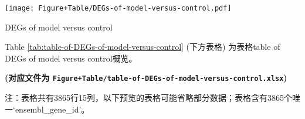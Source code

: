 \documentclass[
]{article}
\begin{document}
\def\@captype{figure}
\begin{center}
\texttt{[image: Figure+Table/DEGs-of-model-versus-control.pdf]}
\caption{DEGs of model versus control}\label{fig:DEGs-of-model-versus-control}
\end{center}

Table \ref{tab:table-of-DEGs-of-model-versus-control} (下方表格) 为表格table of DEGs of model versus control概览。

\textbf{(对应文件为 \texttt{Figure+Table/table-of-DEGs-of-model-versus-control.xlsx})}

\begin{center}\begin{tcolorbox}[colback=gray!10, colframe=gray!50, width=0.9\linewidth, arc=1mm, boxrule=0.5pt]注：表格共有3865行15列，以下预览的表格可能省略部分数据；表格含有3865个唯一`ensembl\_gene\_id'。
\end{tcolorbox}
\end{center}
\end{document}
